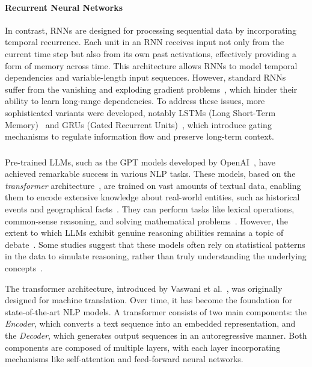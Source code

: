 \paragraph{Recurrent Neural Networks}
%
In contrast, \glspl{RNN} are designed for processing sequential data by incorporating temporal recurrence.
%
Each unit in an \gls{RNN} receives input not only from the current time step but also from its own past activations, effectively providing a form of memory across time.
%
This architecture allows \glspl{RNN} to model temporal dependencies and variable-length input sequences.
%
However, standard \glspl{RNN} suffer from the vanishing and exploding gradient problems~\cite{bengio1994learning}, which hinder their ability to learn long-range dependencies.
%
To address these issues, more sophisticated variants were developed, notably \glspl{LSTM} (Long Short-Term Memory)~\cite{hochreiter1997long} and \glspl{GRU} (Gated Recurrent Units)~\cite{cho2014learning}, which introduce gating mechanisms to regulate information flow and preserve long-term context.


\subsubsection{}\label{subsubsec:llm}
%
Pre-trained \glspl{LLM}, such as the GPT models developed by OpenAI~\cite{radford2018improving}, have achieved remarkable success in various \gls{NLP} tasks.
%
These models, based on the \emph{transformer} architecture~\cite{DBLP:conf/nips/VaswaniSPUJGKP17}, are trained on vast amounts of textual data, enabling them to encode extensive knowledge about real-world entities, such as historical events and geographical facts~\cite{DBLP:journals/tacl/JiangXAN20}.
%
They can perform tasks like lexical operations, common-sense reasoning, and solving mathematical problems~\cite{DBLP:conf/emnlp/MadasuS22,DBLP:journals/tacl/GevaKSKRB21,DBLP:conf/nips/Wei0SBIXCLZ22}.
%
However, the extent to which \glspl{LLM} exhibit genuine reasoning abilities remains a topic of debate~\cite{DBLP:journals/ethicsit/HicksHS24}.
%
Some studies suggest that these models often rely on statistical patterns in the data to simulate reasoning, rather than truly understanding the underlying concepts~\cite{DBLP:conf/fat/BenderGMS21}.
%

The transformer architecture, introduced by Vaswani et al.~\cite{DBLP:conf/nips/VaswaniSPUJGKP17}, was originally designed for machine translation.
%
Over time, it has become the foundation for state-of-the-art \gls{NLP} models.
%
A transformer consists of two main components: the \emph{Encoder}, which converts a text sequence into an embedded representation, and the \emph{Decoder}, which generates output sequences in an autoregressive manner.
%
Both components are composed of multiple layers, with each layer incorporating mechanisms like self-attention and feed-forward neural networks.

